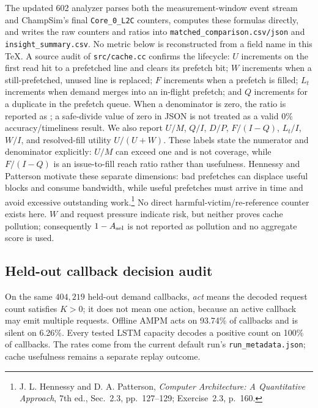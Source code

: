 \documentclass[10pt]{article}
\newcommand{\NA}{\textemdash}
\begin{document}
\begin{infobox}[title={\bfseries Exact interpretation boundaries}]
The updated 602 analyzer parses both the measurement-window event stream and
ChampSim's final \texttt{Core\_0\_L2C} counters, computes these formulas
directly, and writes the raw counters and ratios into
\texttt{matched\_comparison.csv/json} and \texttt{insight\_summary.csv}.
No metric below is reconstructed from a field name in this TeX.  A source
audit of \texttt{src/cache.cc} confirms the lifecycle: $U$ increments on the first read
hit to a prefetched line and clears its prefetch bit; $W$ increments when a
still-prefetched, unused line is replaced; $F$ increments when a prefetch is
filled; $L_t$ increments when demand merges into an in-flight prefetch; and
$Q$ increments for a duplicate in the prefetch queue.  When a denominator is
zero, the ratio is reported as \NA; a safe-divide value of zero in JSON is not
treated as a valid 0\% accuracy/timeliness result.  We also report
$U/M$, $Q/I$, $D/P$, $F/(I-Q)$, $L_t/I$, $W/I$, and resolved-fill
utility $U/(U+W)$.  These labels state the numerator and denominator
explicitly: $U/M$ can exceed one and is not coverage, while $F/(I-Q)$ is an
issue-to-fill reach ratio rather than usefulness.
Hennessy and Patterson motivate these separate dimensions: bad prefetches can
displace useful blocks and consume bandwidth, while useful prefetches must
arrive in time and avoid excessive outstanding work.\footnote{J. L. Hennessy
and D. A. Patterson, \emph{Computer Architecture: A Quantitative Approach},
7th ed., Sec.~2.3, pp.~127--129; Exercise~2.3, p.~160.}
No direct harmful-victim/re-reference counter exists here.  $W$ and request
pressure indicate risk, but neither proves cache pollution; consequently
$1-A_{\rm sel}$ is not reported as pollution and no aggregate score is used.
\end{infobox}

\subsection*{Held-out callback decision audit}
\begin{infobox}[title={\bfseries Dense teacher, always-act student}]
On the same $404{,}219$ held-out demand callbacks, \emph{act} means the decoded
request count satisfies $K>0$; it does not mean one action, because an active
callback may emit multiple requests.  Offline AMPM acts on 93.74\% of
callbacks and is silent on 6.26\%.  Every tested LSTM capacity decodes a
positive count on 100\% of callbacks.  The rates come from the current default
run's \texttt{run\_metadata.json}; cache usefulness remains a separate replay
outcome.
\end{infobox}
\end{document}

